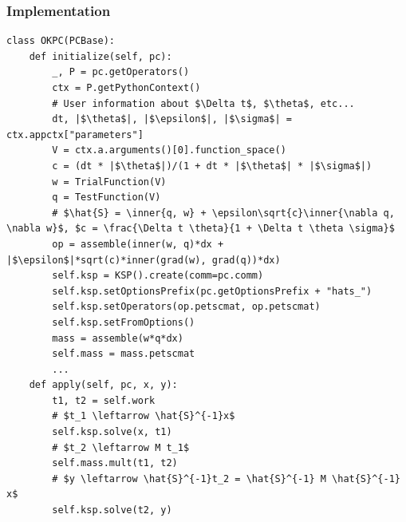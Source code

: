 \documentclass[presentation,aspectratio=43]{beamer}
\newif\ifwidescreen
\newcommand{\inner}[1]{\left\langle #1 \right \rangle}
\newcommand{\colourfiredrake}[1]{\colorbox{red!20}{#1}}
\newcommand{\colourpetsc}[1]{\colorbox{blue!20}{#1}}
\begin{document}
\begin{frame}[fragile]
  \frametitle{Implementation}
\begin{verbatim}
class OKPC(PCBase):
    def initialize(self, pc):
        _, P = pc.getOperators()
        ctx = P.getPythonContext()
        # User information about $\Delta t$, $\theta$, etc...
        dt, |$\theta$|, |$\epsilon$|, |$\sigma$| = ctx.appctx["parameters"]
        V = ctx.a.arguments()[0].function_space()
        c = (dt * |$\theta$|)/(1 + dt * |$\theta$| * |$\sigma$|)
        w = TrialFunction(V)
        q = TestFunction(V)
        # $\hat{S} = \inner{q, w} + \epsilon\sqrt{c}\inner{\nabla q, \nabla w}$, $c = \frac{\Delta t \theta}{1 + \Delta t \theta \sigma}$
        op = assemble(inner(w, q)*dx + |$\epsilon$|*sqrt(c)*inner(grad(w), grad(q))*dx)
        self.ksp = KSP().create(comm=pc.comm)
        self.ksp.setOptionsPrefix(pc.getOptionsPrefix + "hats_")
        self.ksp.setOperators(op.petscmat, op.petscmat)
        self.ksp.setFromOptions()
        mass = assemble(w*q*dx)
        self.mass = mass.petscmat
        ...
    def apply(self, pc, x, y):
        t1, t2 = self.work
        # $t_1 \leftarrow \hat{S}^{-1}x$
        self.ksp.solve(x, t1)
        # $t_2 \leftarrow M t_1$
        self.mass.mult(t1, t2)
        # $y \leftarrow \hat{S}^{-1}t_2 = \hat{S}^{-1} M \hat{S}^{-1} x$
        self.ksp.solve(t2, y)
\end{verbatim}
\end{frame}

\end{document}
